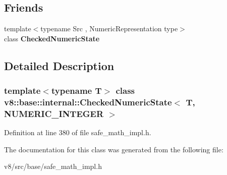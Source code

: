 \subsection*{Friends}
\begin{DoxyCompactItemize}
\item 
\mbox{\label{classv8_1_1base_1_1internal_1_1CheckedNumericState_3_01T_00_01NUMERIC__INTEGER_01_4_aa1362ebca148abcec1d121fc04fb976b}} 
{\footnotesize template$<$typename Src , Numeric\+Representation type$>$ }\\class {\bfseries Checked\+Numeric\+State}
\end{DoxyCompactItemize}


\subsection{Detailed Description}
\subsubsection*{template$<$typename T$>$\newline
class v8\+::base\+::internal\+::\+Checked\+Numeric\+State$<$ T, N\+U\+M\+E\+R\+I\+C\+\_\+\+I\+N\+T\+E\+G\+E\+R $>$}



Definition at line 380 of file safe\+\_\+math\+\_\+impl.\+h.



The documentation for this class was generated from the following file\+:\begin{DoxyCompactItemize}
\item 
v8/src/base/safe\+\_\+math\+\_\+impl.\+h\end{DoxyCompactItemize}
